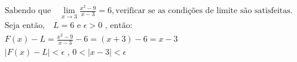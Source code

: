 \begin{ex}
\begin{align}
&\text{Sabendo que} \quad \lim_{x\rightarrow 3} \frac{x^2-9}{x-3}=6,\text{verificar se as condições de limite são satisfeitas.}\nonumber\\
&\text{Seja então,}\quad L = 6\text{ e }\epsilon>0\text{ , então:}\nonumber\\
&F(x) - L = \frac{x^2-9}{x-3}-6 = (x+3)-6 = x - 3\nonumber\\ 
&\left|F(x)- L\right| < \epsilon \text{ , } 0 < \left|x - 3 \right| < \epsilon\nonumber
\end{align}
\end{ex}
